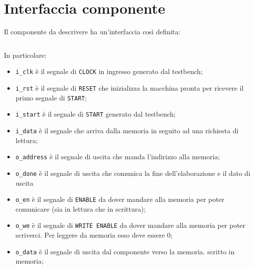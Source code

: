 \section{Interfaccia componente}
Il componente da descrivere ha un’interfaccia così definita:
\inputminted{vhdl}{listings/Capitolo1/componente.vhd}
In particolare:
\begin{itemize}
    \item \texttt{i\_clk} è il segnale di \texttt{CLOCK} in ingresso generato dal testbench;
    \item \texttt{i\_rst} è il segnale di \texttt{RESET} che inizializza la macchina pronta per ricevere il primo segnale di \texttt{START};
    \item \texttt{i\_start} è il segnale di \texttt{START} generato dal testbench;
    \item \texttt{i\_data} è il segnale che arriva dalla memoria in seguito ad una richiesta di lettura;
    \item \texttt{o\_address} è il segnale di uscita che manda l’indirizzo alla memoria;
    \item \texttt{o\_done} è il segnale di uscita che comunica la fine dell’elaborazione e il dato di uscita
    \item \texttt{o\_en} è il segnale di \texttt{ENABLE} da dover mandare alla memoria per poter comunicare
(sia in lettura che in scrittura);
    \item \texttt{o\_we} è il segnale di \texttt{WRITE ENABLE} da dover mandare alla memoria per poter scriverci. Per leggere da memoria esso deve essere 0;
    \item \texttt{o\_data} è il segnale di uscita dal componente verso la memoria.
scritto in memoria;
\end{itemize}